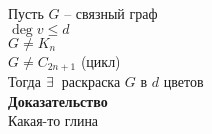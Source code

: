 \documentclass[12pt]{article}
\begin{document}
Пусть $G$ -- связный граф\\
$\deg v \leq d$\\
$G \neq K_n$\\
$G \neq C_{2n+1}$ (цикл)\\
Тогда $\exists\,$ раскраска $G$ в $d$ цветов\\
\textbf{Доказательство}\\
Какая-то глина
\end{document}
